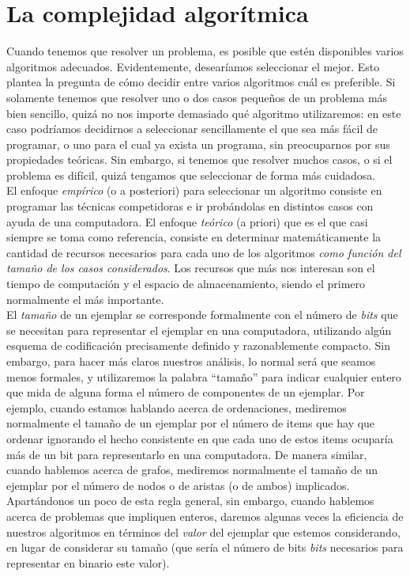 \documentclass[a4paper,12pt]{article}
\begin{document}
\section{La complejidad algorítmica}

Cuando tenemos que resolver un problema, es posible que estén disponibles varios algoritmos adecuados. Evidentemente, desearíamos seleccionar el mejor. Esto plantea la pregunta de cómo decidir entre varios algoritmos cuál es preferible. Si solamente tenemos que resolver uno o dos casos pequeños de un problema más bien sencillo, quizá no nos importe demasiado qué algoritmo utilizaremos: en este caso podríamos decidirnos a seleccionar sencillamente el que sea más fácil de programar, o uno para el cual ya exista un programa, sin preocuparnos por sus propiedades teóricas. Sin embargo, si tenemos que resolver muchos casos, o si el problema es difícil, quizá tengamos que seleccionar de forma más cuidadosa.\\

El enfoque \emph{empírico} (o a posteriori) para seleccionar un algoritmo consiste en programar las técnicas competidoras e ir probándolas en distintos casos con ayuda de una computadora. El enfoque \emph{teórico} (a priori) que es el que casi siempre se toma como referencia, consiste en determinar matemáticamente la cantidad de recursos necesarios para cada uno de los algoritmos \emph{como función del tamaño de los casos considerados}. Los recursos que más nos interesan son el tiempo de computación y el espacio de almacenamiento, siendo el primero normalmente el más importante. \\

El \emph{tamaño} de un ejemplar se corresponde formalmente con el número de \emph{bits} que se necesitan para representar el ejemplar en una computadora, utilizando algún esquema de codificación precisamente definido y razonablemente compacto. Sin embargo, para hacer más claros nuestros análisis, lo normal será que seamos menos formales, y utilizaremos la palabra ``tamaño'' para indicar cualquier entero que mida de alguna forma el número de componentes de un ejemplar. Por ejemplo, cuando estamos hablando acerca de ordenaciones, mediremos normalmente el tamaño de un ejemplar por el número de items que hay que ordenar ignorando el hecho consistente en que cada uno de estos items ocuparía más de un bit para representarlo en una computadora. De manera similar, cuando hablemos acerca de grafos, mediremos normalmente el tamaño de un ejemplar por el número de nodos o de aristas (o de ambos) implicados. Apartándonos un poco de esta regla general, sin embargo, cuando hablemos acerca de problemas que impliquen enteros, daremos algunas veces la eficiencia de nuestros algoritmos en términos del \emph{valor} del ejemplar que estemos considerando, en lugar de considerar su tamaño (que sería el número de bits \emph{bits} necesarios para representar en binario este valor).\\
\end{document}

